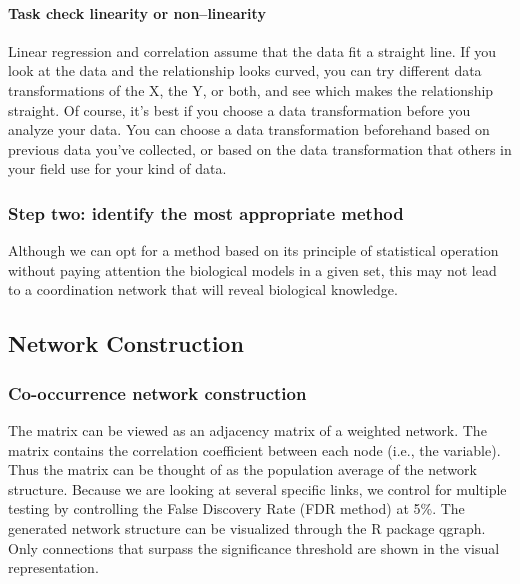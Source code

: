 \documentclass[a4paper]{article}
\begin{document}
\paragraph{Task check linearity or non--linearity}

Linear regression and correlation assume that the data fit a straight line. If you look at the data and the relationship looks curved, you can try different data transformations of the X, the Y, or both, and see which makes the relationship straight. Of course, it's best if you choose a data transformation before you analyze your data. You can choose a data transformation beforehand based on previous data you've collected, or based on the data transformation that others in your field use for your kind of data.

\subsubsection*{Step two: identify the most appropriate method} 
Although we can opt for a method based on its principle of statistical operation without paying attention the biological models in a given set, this may not lead to a coordination network that will reveal biological knowledge.

\subsection*{Network Construction}
\subsubsection*{Co-occurrence network construction}
The matrix can be viewed as an adjacency matrix of a weighted network. The matrix  contains the correlation coefficient  between each node (i.e., the variable). Thus the matrix  can be thought of as the population average of the network structure. Because we are looking at several specific links, we control for multiple testing by controlling the False Discovery Rate (FDR method) at 5\%. The generated network structure can be visualized through the R package qgraph. Only connections that surpass the significance threshold are shown in the visual representation.
\end{document}
